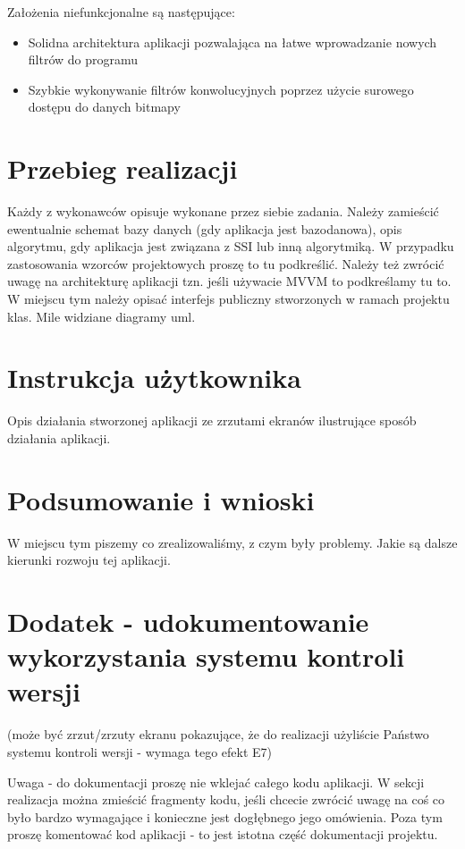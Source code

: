 \documentclass{article}
\begin{document}
Założenia niefunkcjonalne są następujące:
\begin{itemize}
    \item Solidna architektura aplikacji pozwalająca na łatwe wprowadzanie nowych filtrów do programu
    \item Szybkie wykonywanie filtrów konwolucyjnych poprzez użycie surowego dostępu do danych bitmapy
\end{itemize}


\section{Przebieg realizacji}
Każdy z wykonawców opisuje wykonane przez siebie zadania. Należy zamieścić ewentualnie schemat bazy danych (gdy aplikacja jest bazodanowa), opis algorytmu, gdy aplikacja jest związana z SSI lub inną algorytmiką. W przypadku zastosowania wzorców projektowych proszę to tu podkreślić. Należy też zwrócić uwagę na architekturę aplikacji tzn. jeśli używacie MVVM to podkreślamy tu to.
W miejscu tym należy opisać interfejs publiczny stworzonych w ramach projektu klas. Mile widziane diagramy uml.
\section{Instrukcja użytkownika}
Opis działania stworzonej aplikacji ze zrzutami ekranów ilustrujące sposób działania aplikacji.
\section{Podsumowanie i wnioski}
W miejscu tym piszemy co zrealizowaliśmy, z czym były problemy. Jakie są dalsze kierunki rozwoju tej aplikacji.  
\section{Dodatek - udokumentowanie wykorzystania systemu kontroli wersji}
(może być zrzut/zrzuty ekranu pokazujące, że do realizacji użyliście Państwo systemu kontroli wersji  - wymaga tego efekt E7)

Uwaga - do dokumentacji proszę nie wklejać całego kodu aplikacji.  W sekcji realizacja można zmieścić fragmenty kodu, jeśli chcecie zwrócić uwagę na coś co było bardzo wymagające i konieczne jest dogłębnego jego omówienia. 
Poza tym proszę komentować kod aplikacji - to jest istotna część dokumentacji projektu.
\end{document}
